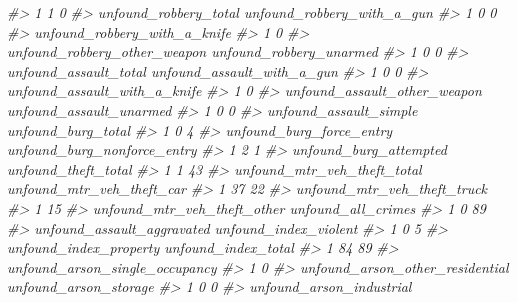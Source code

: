 \documentclass[
]{krantz}
\makeatletter
\newenvironment{Shaded}{\begin{snugshade}}{\end{snugshade}}
\newcommand{\CommentTok}[1]{\textcolor[rgb]{0.37,0.37,0.37}{\textit{#1}}}
\newenvironment{kframe}{%
\medskip{}
\setlength{\fboxsep}{.8em}
 \def\at@end@of@kframe{}%
 \ifinner\ifhmode%
  \def\at@end@of@kframe{\end{minipage}}%
  \begin{minipage}{\columnwidth}%
 \fi\fi%
 \def\FrameCommand##1{\hskip\@totalleftmargin \hskip-\fboxsep
 \colorbox{shadecolor}{##1}\hskip-\fboxsep
     \hskip-\linewidth \hskip-\@totalleftmargin \hskip\columnwidth}%
 \MakeFramed {\advance\hsize-\width
   \@totalleftmargin\z@ \linewidth\hsize
   \@setminipage}}%
 {\par\unskip\endMakeFramed%
 \at@end@of@kframe}
\renewenvironment{Shaded}{\begin{kframe}}{\end{kframe}}
\makeatother
\begin{document}
\begin{Shaded}
\begin{Highlighting}[]
\CommentTok{\#\textgreater{} 1                     1                      0}
\CommentTok{\#\textgreater{}   unfound\_robbery\_total unfound\_robbery\_with\_a\_gun}
\CommentTok{\#\textgreater{} 1                     0                          0}
\CommentTok{\#\textgreater{}   unfound\_robbery\_with\_a\_knife}
\CommentTok{\#\textgreater{} 1                            0}
\CommentTok{\#\textgreater{}   unfound\_robbery\_other\_weapon unfound\_robbery\_unarmed}
\CommentTok{\#\textgreater{} 1                            0                       0}
\CommentTok{\#\textgreater{}   unfound\_assault\_total unfound\_assault\_with\_a\_gun}
\CommentTok{\#\textgreater{} 1                     0                          0}
\CommentTok{\#\textgreater{}   unfound\_assault\_with\_a\_knife}
\CommentTok{\#\textgreater{} 1                            0}
\CommentTok{\#\textgreater{}   unfound\_assault\_other\_weapon unfound\_assault\_unarmed}
\CommentTok{\#\textgreater{} 1                            0                       0}
\CommentTok{\#\textgreater{}   unfound\_assault\_simple unfound\_burg\_total}
\CommentTok{\#\textgreater{} 1                      0                  4}
\CommentTok{\#\textgreater{}   unfound\_burg\_force\_entry unfound\_burg\_nonforce\_entry}
\CommentTok{\#\textgreater{} 1                        2                           1}
\CommentTok{\#\textgreater{}   unfound\_burg\_attempted unfound\_theft\_total}
\CommentTok{\#\textgreater{} 1                      1                  43}
\CommentTok{\#\textgreater{}   unfound\_mtr\_veh\_theft\_total unfound\_mtr\_veh\_theft\_car}
\CommentTok{\#\textgreater{} 1                          37                        22}
\CommentTok{\#\textgreater{}   unfound\_mtr\_veh\_theft\_truck}
\CommentTok{\#\textgreater{} 1                          15}
\CommentTok{\#\textgreater{}   unfound\_mtr\_veh\_theft\_other unfound\_all\_crimes}
\CommentTok{\#\textgreater{} 1                           0                 89}
\CommentTok{\#\textgreater{}   unfound\_assault\_aggravated unfound\_index\_violent}
\CommentTok{\#\textgreater{} 1                          0                     5}
\CommentTok{\#\textgreater{}   unfound\_index\_property unfound\_index\_total}
\CommentTok{\#\textgreater{} 1                     84                  89}
\CommentTok{\#\textgreater{}   unfound\_arson\_single\_occupancy}
\CommentTok{\#\textgreater{} 1                              0}
\CommentTok{\#\textgreater{}   unfound\_arson\_other\_residential unfound\_arson\_storage}
\CommentTok{\#\textgreater{} 1                               0                     0}
\CommentTok{\#\textgreater{}   unfound\_arson\_industrial}

\end{Highlighting}
\end{Shaded}
\end{document}
